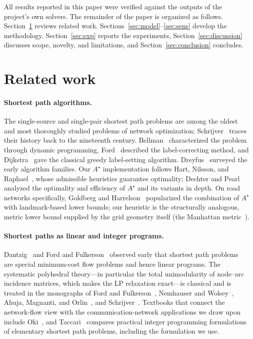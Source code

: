 \documentclass[10pt,twocolumn]{article}
\begin{document}
All results reported in this paper were verified against the outputs of the project's own
solvers. The remainder of the paper is organized as follows.
Section~\ref{sec:related} reviews related work. Sections~\ref{sec:model}--\ref{sec:sens}
develop the methodology. Section~\ref{sec:exp} reports the experiments,
Section~\ref{sec:discussion} discusses scope, novelty, and limitations, and
Section~\ref{sec:conclusion} concludes.

\section{Related work}
\label{sec:related}

\paragraph{Shortest path algorithms.}
The single-source and single-pair shortest path problems are among the oldest and most
thoroughly studied problems of network optimization; Schrijver~\cite{schrijver12} traces
their history back to the nineteenth century. Bellman~\cite{bellman58} characterized the
problem through dynamic programming, Ford~\cite{ford56} described the label-correcting
method, and Dijkstra~\cite{dijkstra59} gave the classical greedy label-setting algorithm.
Dreyfus~\cite{dreyfus69} surveyed the early algorithm families. Our $A^{\star}$ implementation
follows Hart, Nilsson, and Raphael~\cite{hnr68}, whose admissible heuristics guarantee
optimality; Dechter and Pearl~\cite{dechterpearl85} analyzed the optimality and efficiency
of $A^{\star}$ and its variants in depth. On road networks specifically, Goldberg and
Harrelson~\cite{goldbergharrelson05} popularized the combination of $A^{\star}$ with landmark-based
lower bounds; our heuristic is the structurally analogous, metric lower bound supplied by
the grid geometry itself (the Manhattan metric~\cite{krause86}).

\paragraph{Shortest paths as linear and integer programs.}
Dantzig~\cite{dantzig60} and Ford and Fulkerson~\cite{fordfulkerson62} observed early that
shortest path problems are special minimum-cost flow problems and hence linear programs.
The systematic polyhedral theory---in particular the total unimodularity of node--arc
incidence matrices, which makes the LP relaxation exact---is classical and is treated in
the monographs of Ford and Fulkerson~\cite{fordfulkerson62}, Nemhauser and
Wolsey~\cite{nemhauserwolsey88}, Ahuja, Magnanti, and Orlin~\cite{ahuja93}, and
Schrijver~\cite{schrijver03}. Textbooks that connect the network-flow view with the
communication-network applications we draw upon include Oki~\cite{oki12}, and
Taccari~\cite{taccari16} compares practical integer programming formulations of elementary
shortest path problems, including the formulation we use.
\end{document}
